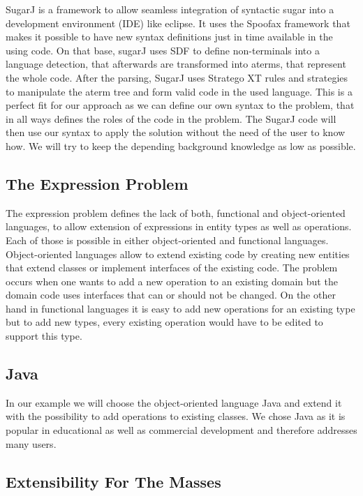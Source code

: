 \documentclass{report}
\begin{document}
SugarJ \cite{Erdweg-SugarJ-2011} is a framework to allow seamless integration of syntactic sugar into a development environment (IDE) like eclipse. It uses the Spoofax framework that makes it possible to have new syntax definitions just in time available in the using code. On that base, sugarJ uses SDF to define non-terminals into a language detection, that afterwards are transformed into aterms, that represent the whole code. After the parsing, SugarJ uses Stratego XT rules and strategies to manipulate the aterm tree and form valid code in the used language. This is a perfect fit for our approach as we can define our own syntax to the problem, that in all ways defines the roles of the code in the problem. The SugarJ code will then use our syntax to apply the solution without the need of the user to know how. We will try to keep the depending background knowledge as low as possible.

\subsection{The Expression Problem}

The expression problem \cite{Wadler-Expression-1998} defines the lack of both, functional and object-oriented languages, to allow extension of expressions in entity types as well as operations. Each of those is possible in either object-oriented and functional languages. Object-oriented languages allow to extend existing code by creating new entities that extend classes or implement interfaces of the existing code. The problem occurs when one wants to add a new operation to an existing domain but the domain code uses interfaces that can or should not be changed. On the other hand in functional languages it is easy to add new operations for an existing type but to add new types, every existing operation would have to be edited to support this type.

\subsection{Java}

In our example we will choose the object-oriented language Java and extend it with the possibility to add operations to existing classes. We chose Java as it is popular in educational \cite{Raadt-Language-2002} as well as commercial development and therefore addresses many users.

\subsection{Extensibility For The Masses}
\end{document}
